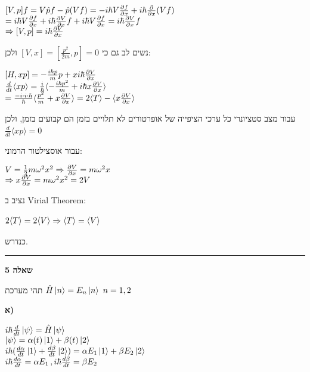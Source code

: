 \documentclass[14pt]{extarticle}
\makeatletter
\newenvironment{lefteqs}{%
    \begin{english}%
    \begin{flushleft}%
    \renewcommand{\arraystretch}{1.3}%
    $\begin{array}{@{}l@{}}%
}{%
    \end{array}$%
    \end{flushleft}%
    \end{english}%
}
\makeatother
\begin{document}
\begin{lefteqs}
    [V,p]f = V\hat{p}f - \hat{p}(Vf) = -i\hbar V \frac{\partial f}{\partial x} + i\hbar \frac{\partial}{\partial x}(Vf) \\
    = i\hbar V \frac{\partial f}{\partial x} + i\hbar \frac{\partial V}{\partial x}f + i\hbar V \frac{\partial f}{\partial x} = i\hbar \frac{\partial V}{\partial x}f \\
    \Rightarrow [V,p] = i\hbar \frac{\partial V}{\partial x}
\end{lefteqs}

נשים לב גם כי $[V,x]=[\frac{p^2}{2m},p]=0$ ולכן:
\begin{lefteqs}
    [H,xp] = -\frac{i\hbar p}{m}p + x i \hbar \frac{\partial V}{\partial x} \\
    \frac{d}{dt} \langle xp \rangle = \frac{i}{\hbar} \langle -\frac{i\hbar p^2}{m} + i \hbar x \frac{\partial V}{\partial x} \rangle \\
    = \frac{-i \cdot i \cdot \hbar}{\hbar} \langle \frac{p^2}{m} + x\frac{\partial V}{\partial x} \rangle = 2\langle T \rangle - \langle x \frac{\partial V}{\partial x} \rangle
\end{lefteqs}

עבור מצב סטציונרי כל ערכי הציפייה של אופרטורים לא תלויים בזמן הם קבועים בזמן, ולכן $\frac{d}{dt} \langle xp \rangle = 0$

עבור אוסצילטור הרמוני:
\begin{lefteqs}
    V=\frac{1}{2}m \omega^2 x^2 \Rightarrow \frac{\partial V}{\partial x} = m\omega^2 x \\
    \Rightarrow x \frac{\partial V}{\partial x} = m\omega^2 x^2 = 2V
\end{lefteqs}

נציב ב Virial Theorem:

\begin{lefteqs}
    2\langle T \rangle = 2 \langle V \rangle \Rightarrow \langle T \rangle = \langle V \rangle
\end{lefteqs}
כנדרש.

\vspace{3em}
\hrule
\vspace{2em}

\textbf{\large שאלה 5}

תהי מערכת $\hat{H} \ket{n} = E_n \ket{n} \, \, n=1,2$

\textbf{א)}

\begin{lefteqs}
    i\hbar \frac{d}{dt} \ket{\psi} = \hat{H} \ket{\psi} \\
    \ket{\psi} = \alpha(t) \ket{1} + \beta(t) \ket{2} \\
    i\hbar (\frac{d\alpha}{dt} \ket{1} + \frac{d\beta}{dt} \ket{2}) = \alpha E_1 \ket{1} + \beta E_2 \ket{2} \\
    i\hbar \frac{d\alpha}{dt} = \alpha E_1 \, , i\hbar \frac{d\beta}{dt} = \beta E_2 \\
\end{lefteqs}
\end{document}
